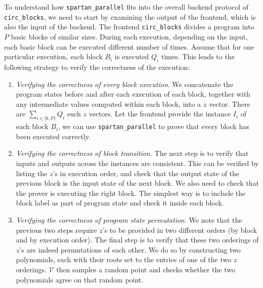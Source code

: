 \documentclass{article}
\newcommand{\code}{\texttt}
\newcommand{\V}{\mathcal{V}}
\begin{document}
To understand how \code{spartan\_parallel} fits into the overall backend protocol of \code{circ\_blocks}, we need to start by examining the output of the frontend, which is also the input of the backend. The frontend \code{circ\_blocks} divides a program into $P$ basic blocks of similar sizes. During each execution, depending on the input, each basic block can be executed different number of times. Assume that for one particular execution, each block $B_i$ is executed $Q_i$ times. This leads to the following strategy to verify the correctness of the execution:
\begin{enumerate}
    \item \emph{Verifying the correctness of every block execution}. We concatenate the program states before and after each execution of each block, together with any intermediate values computed within each block, into a $z$ vector. There are $\sum_{i\in [0, P)} Q_i$ such $z$ vectors. Let the frontend provide the instance $I_i$ of each block $B_i$, we can use \code{spartan\_parallel} to prove that every block has been executed correctly.
    \item \emph{Verifying the correctness of block transition}. The next step is to verify that inputs and outputs across the instances are consistent. This can be verified by listing the $z$'s in execution order, and check that the output state of the previous block is the input state of the next block. We also need to check that the prover is executing the right block. The simplest way is to include the block label as part of program state and check it inside each block.
    \item \emph{Verifying the correctness of program state permutation}. We note that the previous two steps require $z$'s to be provided in two different orders (by block and by execution order). The final step is to verify that these two orderings of $z$'s are indeed permutations of each other. We do so by constructing two polynomials, each with their roots set to the entries of one of the two $z$ orderings. $\V$ then samples a random point and checks whether the two polynomials agree on that random point.
\end{enumerate}
\end{document}
